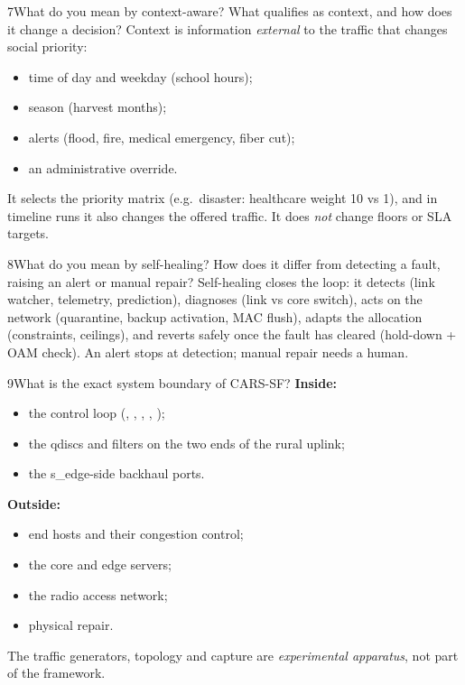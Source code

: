 \begin{qa}{7}{What do you mean by context-aware? What qualifies as context, and how does it change a decision?}
Context is information \emph{external} to the traffic that changes social priority:
\begin{itemize}
\item time of day and weekday (school hours);
\item season (harvest months);
\item alerts (flood, fire, medical emergency, fiber cut);
\item an administrative override.
\end{itemize}
It selects the priority matrix (e.g.\ disaster: healthcare weight 10 vs 1), and in timeline runs it also changes the
offered traffic. It does \emph{not} change floors or SLA targets.
\end{qa}

\begin{qa}{8}{What do you mean by self-healing? How does it differ from detecting a fault, raising an alert or manual repair?}
Self-healing closes the loop: it detects (link watcher, telemetry, prediction), diagnoses (link vs core switch),
acts on the network (quarantine, backup activation, MAC flush), adapts the allocation (constraints, ceilings), and
reverts safely once the fault has cleared (hold-down + OAM check). An alert stops at detection; manual repair needs a human.
\end{qa}

\begin{qa}{9}{What is the exact system boundary of CARS-SF?}
\textbf{Inside:}
\begin{itemize}
\item the control loop (, , , , );
\item the qdiscs and filters on the two ends of the rural uplink;
\item the s\_edge-side backhaul ports.
\end{itemize}
\textbf{Outside:}
\begin{itemize}
\item end hosts and their congestion control;
\item the core and edge servers;
\item the radio access network;
\item physical repair.
\end{itemize}
The traffic generators, topology and capture are \emph{experimental apparatus}, not part of the framework.
\end{qa}

